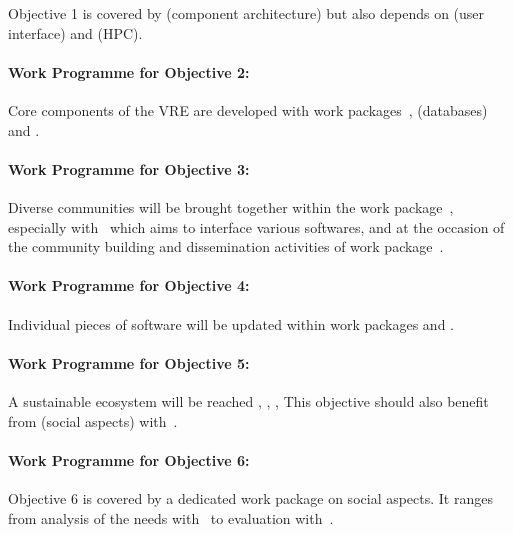 \documentclass[noworkareas,deliverables,\classoptions]{euproposal}       %
\begin{document}
\begin{proposal}
Objective 1 is covered by  (component architecture) but also depends
on  (user interface) and  (HPC).

\paragraph{Work Programme for Objective 2: }

Core components of the VRE are developed with work packages~,
  (databases) and .

\paragraph{Work Programme for Objective 3: }

Diverse communities will be brought together within the work
package~, especially
with~ which aims to
interface various softwares, and at the occasion of the community
building and dissemination activities of work package~.

\paragraph{Work Programme for Objective 4: }

Individual pieces of software will be updated within work packages  and .

\paragraph{Work Programme for Objective 5: }

A sustainable ecosystem will be reached
, , ,  
This objective should also benefit from  (social aspects) with~.

\paragraph{Work Programme for Objective 6: }

Objective 6 is covered by a dedicated work package  on social aspects.
It ranges from analysis of the needs with~ to
evaluation with~.


\end{proposal}
\end{document}
